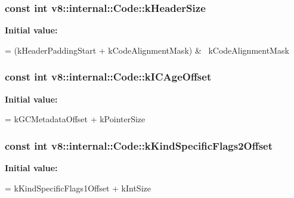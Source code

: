 \subsubsection[{k\+Header\+Size}]{\setlength{\rightskip}{0pt plus 5cm}const int v8\+::internal\+::\+Code\+::k\+Header\+Size\hspace{0.3cm}{\ttfamily [static]}}\label{classv8_1_1internal_1_1_code_abfc7192bae05436fc229b94bbab81648}
{\bfseries Initial value\+:}
\begin{DoxyCode}
=
      (kHeaderPaddingStart + kCodeAlignmentMask) & ~kCodeAlignmentMask
\end{DoxyCode}
\hypertarget{classv8_1_1internal_1_1_code_ace642a40217f211270408faf1790f7f2}{}
\subsubsection[{k\+I\+C\+Age\+Offset}]{\setlength{\rightskip}{0pt plus 5cm}const int v8\+::internal\+::\+Code\+::k\+I\+C\+Age\+Offset\hspace{0.3cm}{\ttfamily [static]}}\label{classv8_1_1internal_1_1_code_ace642a40217f211270408faf1790f7f2}
{\bfseries Initial value\+:}
\begin{DoxyCode}
=
      kGCMetadataOffset + kPointerSize
\end{DoxyCode}
\hypertarget{classv8_1_1internal_1_1_code_a312ff3415cd017ab9871db506fa39b6d}{}
\subsubsection[{k\+Kind\+Specific\+Flags2\+Offset}]{\setlength{\rightskip}{0pt plus 5cm}const int v8\+::internal\+::\+Code\+::k\+Kind\+Specific\+Flags2\+Offset\hspace{0.3cm}{\ttfamily [static]}}\label{classv8_1_1internal_1_1_code_a312ff3415cd017ab9871db506fa39b6d}
{\bfseries Initial value\+:}
\begin{DoxyCode}
=
      kKindSpecificFlags1Offset + kIntSize
\end{DoxyCode}
\hypertarget{classv8_1_1internal_1_1_code_a5ec9f802ed75109281eb87650ba00e6d}{}
